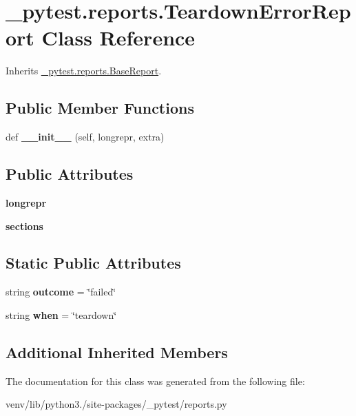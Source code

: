 \hypertarget{class__pytest_1_1reports_1_1_teardown_error_report}{}\section{\+\_\+pytest.\+reports.\+Teardown\+Error\+Report Class Reference}
\label{class__pytest_1_1reports_1_1_teardown_error_report}


Inherits \hyperlink{class__pytest_1_1reports_1_1_base_report}{\+\_\+pytest.\+reports.\+Base\+Report}.

\subsection*{Public Member Functions}
\begin{DoxyCompactItemize}
\item 
\mbox{\label{class__pytest_1_1reports_1_1_teardown_error_report_a5507900bb8db26458b97a9dbb95fa82e}} 
def {\bfseries \+\_\+\+\_\+init\+\_\+\+\_\+} (self, longrepr, extra)
\end{DoxyCompactItemize}
\subsection*{Public Attributes}
\begin{DoxyCompactItemize}
\item 
\mbox{\label{class__pytest_1_1reports_1_1_teardown_error_report_a7e5ae69a75b22a6a1d5ab7de4b42debf}} 
{\bfseries longrepr}
\item 
\mbox{\label{class__pytest_1_1reports_1_1_teardown_error_report_a34f46badf38e4547be72dd451b66d7f1}} 
{\bfseries sections}
\end{DoxyCompactItemize}
\subsection*{Static Public Attributes}
\begin{DoxyCompactItemize}
\item 
\mbox{\label{class__pytest_1_1reports_1_1_teardown_error_report_a10a585563089f8ca887e6758182447ee}} 
string {\bfseries outcome} = \char`\"{}failed\char`\"{}
\item 
\mbox{\label{class__pytest_1_1reports_1_1_teardown_error_report_a07c8d14e19f83a936e0ae515d6757134}} 
string {\bfseries when} = \char`\"{}teardown\char`\"{}
\end{DoxyCompactItemize}
\subsection*{Additional Inherited Members}


The documentation for this class was generated from the following file\+:\begin{DoxyCompactItemize}
\item 
venv/lib/python3./site-\/packages/\+\_\+pytest/reports.\+py\end{DoxyCompactItemize}

